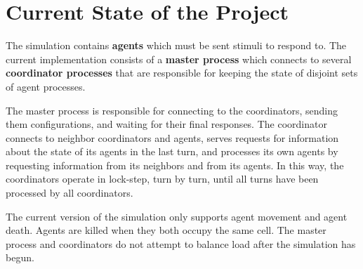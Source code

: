 \section{Current State of the Project}

The simulation contains \textbf{agents} which must be sent stimuli to respond to. The current implementation consists of a \textbf{master process} which connects to several \textbf{coordinator processes} that are responsible for keeping the state of disjoint sets of agent processes.

The master process is responsible for connecting to the coordinators, sending them configurations, and waiting for their final responses. The coordinator connects to neighbor coordinators and agents, serves requests for information about the state of its agents in the last turn, and processes its own agents by requesting information from its neighbors and from its agents. In this way, the coordinators operate in lock-step, turn by turn, until all turns have been processed by all coordinators.

The current version of the simulation only supports agent movement and agent death. Agents are killed when they both occupy the same cell. The master process and coordinators do not attempt to balance load after the simulation has begun.
